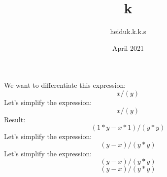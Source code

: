 \documentclass{article}
\title{k}
\author{heiduk.k.k.s }
\date{April 2021}
\begin{document}
\maketitle
\centering
We want to differentiate this expression:
$$ x/(y)$$
\centering
Let's simplify the expression:
$$ x/(y)$$
\centering
Result:
$$ (1*y-x*1)/(y*y)$$
\centering
Let's simplify the expression:
$$ (y-x)/(y*y)$$
\centering
Let's simplify the expression:
$$ (y-x)/(y*y)$$
$$ (y-x)/(y*y)$$
\end{document}
